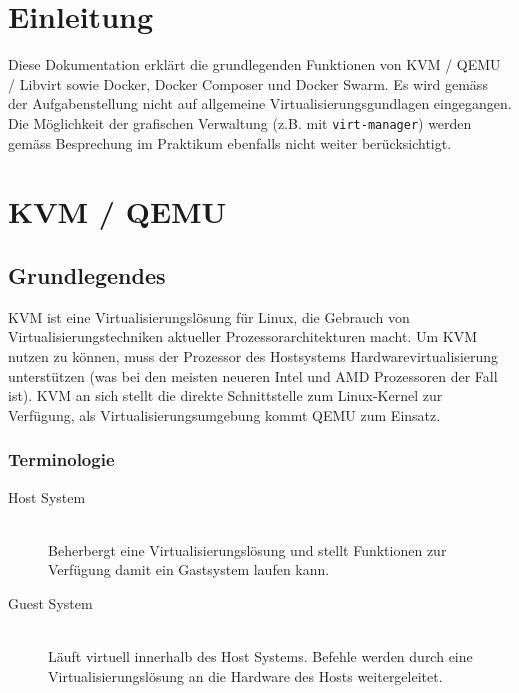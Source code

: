 

\newcommand{\SUBJECT}{Report}
\newcommand{\TITLE}{Cloud Infrastructre Lab 4}











\section*{Einleitung}
Diese Dokumentation erklärt die grundlegenden Funktionen von KVM / QEMU / Libvirt sowie Docker, Docker Composer und Docker Swarm. Es wird gemäss der Aufgabenstellung nicht auf allgemeine Virtualisierungsgundlagen eingegangen. Die Möglichkeit der grafischen Verwaltung (z.B. mit \lstinline|virt-manager|) werden gemäss Besprechung im Praktikum ebenfalls nicht weiter berücksichtigt.


\section{KVM / QEMU}
\subsection{Grundlegendes}
KVM ist eine Virtualisierungslösung für Linux, die Gebrauch von Virtualisierungstechniken aktueller Prozessorarchitekturen macht. Um KVM nutzen zu können, muss der Prozessor des Hostsystems Hardwarevirtualisierung unterstützen (was bei den meisten neueren Intel und AMD Prozessoren der Fall ist). KVM an sich stellt die direkte Schnittstelle zum Linux-Kernel zur Verfügung, als Virtualisierungsumgebung kommt QEMU zum Einsatz.

\subsubsection{Terminologie}
\begin{description}
	\item[Host System] \hfill \\
	Beherbergt eine Virtualisierungslösung und stellt Funktionen zur Verfügung damit ein Gastsystem laufen kann.
	\item[Guest System] \hfill \\
	Läuft virtuell innerhalb des Host Systems. Befehle werden durch eine Virtualisierungslösung an die Hardware des Hosts weitergeleitet.
\end{description}

